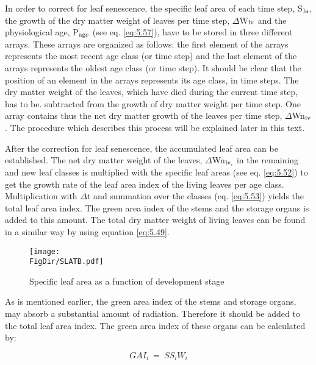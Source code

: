 In order to correct for leaf senescence, the specific leaf area of each time step, S$_{{\rm la}}$, the
growth of the dry matter weight of leaves per time step, $\Delta$W$_{{\rm lv}}$ and the physiological age,
P$_{{\rm age}}$ (see eq. \ref{eq:5.57}), have to be stored in three different arrays. These arrays are organized
as follows: the first element of the arrays represents the most recent age class (or time
step) and the last element of the arrays represents the oldest age class (or time step). It
should be clear that the position of an element in the arrays represents its age class, in
time steps. The dry matter weight of the leaves, which have died during the current time
step, has to be. subtracted from the growth of dry matter weight per time step. One array
contains thus the net dry matter growth of the leaves per time step, $\Delta$Wn$_{{\rm lv}}$. 
The procedure which describes this process will be explained later in this text. 

After the correction for leaf senescence, the accumulated leaf area can be established. The
net dry matter weight of the leaves, $\Delta$Wn$_{{\rm lv,}}$  in the remaining and new leaf classes is
multiplied with the specific leaf areas (see eq. \ref{eq:5.52}) to get the growth rate of the leaf area
index of the living leaves per age class. Multiplication with $\Delta$t and summation over the
classes (eq. \ref{eq:5.53}) yields the total leaf area index. The green area index of the stems and
the storage organs is added to this amount. The total dry matter weight of living leaves
can be found in a similar way by using equation \ref{eq:5.49}.

\begin{figure}[p]
	\centering
	\texttt{[image: \\FigDir/SLATB.pdf]}
	\caption{Specific leaf area as a function of development stage}
	\label{fig:SpecificLeafArea}
\end{figure}

As is mentioned earlier, the green area index of the stems and storage organs, may absorb
a substantial amount of radiation. Therefore it should be added to the total leaf area
index. The green area index of these organs can be calculated by:

\begin{equation}
GAI_{i} ~=~SS _{i} W _{i} 
\end{equation}

